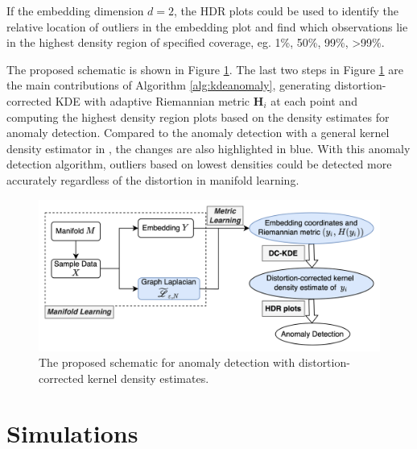 \documentclass[11pt,a4paper,]{article}
\begin{document}
If the embedding dimension \(d=2\), the HDR plots \autocite{Hyndman1996-lk} could be used to identify the relative location of outliers in the embedding plot and find which observations lie in the highest density region of specified coverage, eg. 1\%, 50\%, 99\%, \textgreater99\%.

The proposed schematic is shown in Figure \ref{fig:vkde}. The last two steps in Figure \ref{fig:vkde} are the main contributions of Algorithm \ref{alg:kdeanomaly}, generating distortion-corrected KDE with adaptive Riemannian metric \(\pmb{H}_i\) at each point and computing the highest density region plots based on the density estimates for anomaly detection. Compared to the anomaly detection with a general kernel density estimator in \textcite{Cheng2021-ex}, the changes are also highlighted in blue. With this anomaly detection algorithm, outliers based on lowest densities could be detected more accurately regardless of the distortion in manifold learning.



\begin{figure}

{\centering \includegraphics[width=0.95\linewidth]{figures/DC-KDE} 

}

\caption{The proposed schematic for anomaly detection with distortion-corrected kernel density estimates.}\label{fig:vkde}
\end{figure}

\hypertarget{simulation}{%
\section{Simulations}\label{simulation}}
\end{document}
